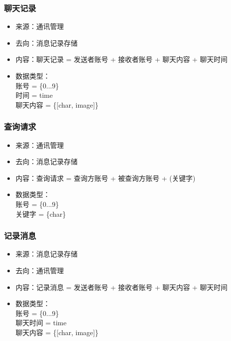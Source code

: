             \subsubsection{聊天记录}
            \begin{itemize}
            \item 来源：通讯管理
            \item 去向：消息记录存储
            \item 内容：聊天记录 = 发送者账号 + 接收者账号 + 聊天内容 + 聊天时间
            \item 数据类型：\\
            账号 = \{0...9\}\\
            时间 = time\\
            聊天内容 = \{[char, image]\}\\
            \end{itemize}

            \subsubsection{查询请求}
            \begin{itemize}
            \item 来源：通讯管理
            \item 去向：消息记录存储
            \item 内容：查询请求 = 查询方账号 + 被查询方账号 + (关键字)
            \item 数据类型：\\
            账号 = \{0...9\}\\
            关键字 = \{char\}\\
            \end{itemize}

            \subsubsection{记录消息}
            \begin{itemize}
            \item 来源：消息记录存储
            \item 去向：通讯管理
            \item 内容：记录消息 = 发送者账号 + 接收者账号 + 聊天内容 + 聊天时间
            \item 数据类型：\\
            账号 = \{0...9\}\\
            聊天时间 = time\\
            聊天内容 = \{[char, image]\}\\
            \end{itemize}

